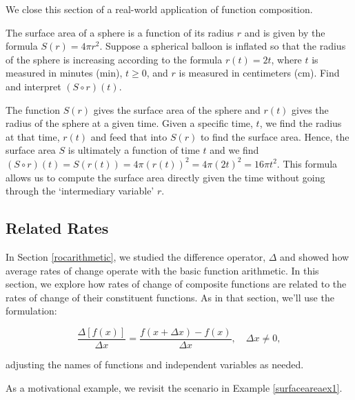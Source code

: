 \documentclass{ximera}
\begin{document}
We close this section of a real-world application of function composition.

\begin{example}\label{surfaceareaex1}  The surface area of a sphere is a function of its radius $r$ and is given by the formula $S(r) = 4 \pi r^2$.    Suppose a spherical balloon is inflated so that the radius of the sphere is increasing according to the formula $r(t) = 2t$, where $t$ is measured in minutes (min), $t \geq 0$, and $r$ is measured in centimeters (cm).  Find and interpret $(S \circ r)(t)$.

\begin{explanation} The function  $S(r)$ gives the surface area of the sphere and $r(t)$ gives the radius of the sphere at a given time.    Given a specific time, $t$, we find the radius at that time, $r(t)$ and feed that into $S(r)$ to find the surface area. Hence,  the surface area $S$ is ultimately a function of time $t$ and we find $(S \circ r)(t) = S(r(t)) = 4 \pi (r(t))^2 = 4 \pi \left(2t\right)^2 = 16 \pi t^{2}$.  This formula allows us to compute the surface area directly given the time without going through the `intermediary variable' $r$. 

\end{explanation}
\end{example}

\subsection{Related Rates}
\label{RelatedRates}

In Section \ref{rocarithmetic}, we studied the difference operator, $\Delta$ and showed how average rates of change operate with the basic function arithmetic.  In this section, we explore how rates of change of composite functions are related to the rates of change of their constituent functions. As in that section, we'll use the formulation:

\[ \frac{\Delta[f(x)]}{\Delta x} = \frac{f(x+\Delta x)-f(x)}{\Delta x}, \quad \Delta x \neq 0,\]

 adjusting the names of functions and independent variables as needed. 
 
 
 As a motivational example, we revisit the scenario in  Example \ref{surfaceareaex1}.
\end{document}
